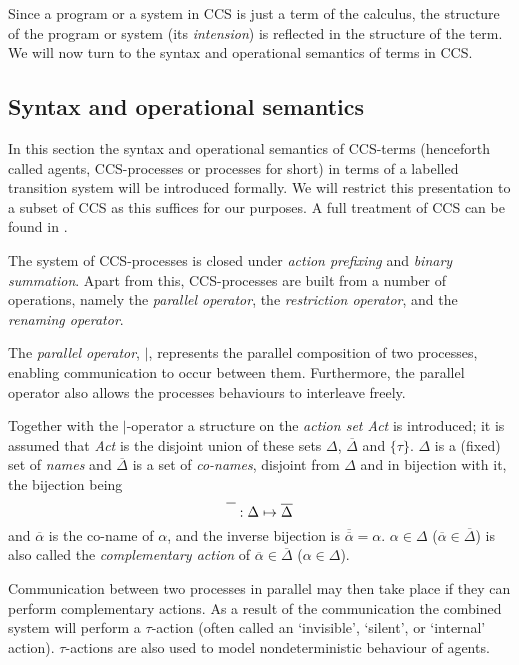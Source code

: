 Since a program or a system in CCS is just a term of the calculus, the structure of the program or system (its {\it intension\/}) is reflected in the structure of the term. We will now turn to the syntax and operational semantics of terms in CCS.


\subsection{Syntax and operational semantics}

In this section the syntax and operational semantics of CCS-terms (henceforth called agents, CCS-processes or processes for short) in terms of a labelled transition system \cite{Plotkin} will be introduced formally. We will restrict this presentation to a subset of CCS as this suffices for our purposes. A full treatment of CCS can be found in \cite{Milner}.

The system of CCS-processes is closed under {\it action prefixing\/} and {\it binary summation}. Apart from this, CCS-processes are built from a number of operations, namely the {\it parallel operator}, the {\it restriction operator}, and the {\it renaming operator}.

The {\it parallel operator}, $\mid$, represents the parallel composition of two processes, enabling communication to occur between them. Furthermore, the parallel operator also allows the processes behaviours to interleave freely.

Together with the $\mid$-operator a structure on the {\it action set Act\/} is introduced; it is assumed that {\it Act\/} is the disjoint union of these sets $\Delta$, $\overline{\Delta}$ and $\{\tau\}$. $\Delta$ is a (fixed) set of {\it names\/} and $\overline{\Delta}$ is a set of {\it co-names\/}, disjoint from $\Delta$ and in bijection with it, the bijection being
\begin{equation}
\overline{\rule{0cm}{.8em}\ \ } : \Delta \mapsto \overline{\Delta}
\end{equation}
and $\overline{\alpha}$ is the co-name of $\alpha$, and the inverse bijection is $\overline{\overline{\alpha}} = \alpha$. $\alpha\in\Delta$ ($\overline{\alpha}\in\overline{\Delta}$) is also called the {\it complementary action\/} of $\overline{\alpha}\in\overline{\Delta}$ ($\alpha\in\Delta$).

Communication between two processes in parallel may then take place if they can perform complementary actions. As a result of the communication the combined system will perform a $\tau$-action (often called an `invisible', `silent', or `internal' action). $\tau$-actions are also used to model nondeterministic behaviour of agents.

